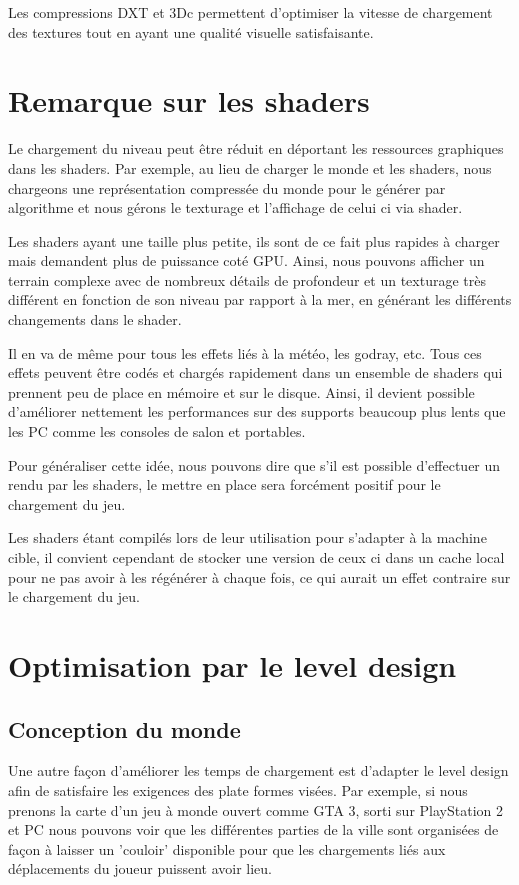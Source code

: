 \documentclass[a4paper, 12pt]{article} %
\begin{document}
Les compressions DXT et 3Dc permettent d'optimiser la vitesse de chargement des textures tout en ayant une qualité visuelle satisfaisante.

\newpage
\section{Remarque sur les shaders}
Le chargement du niveau peut être réduit en déportant les ressources graphiques dans les shaders. Par exemple, au lieu de charger le monde et les shaders, nous chargeons une représentation compressée du monde pour le générer par algorithme et nous gérons le texturage et l'affichage de celui ci via shader. 

Les shaders ayant une taille plus petite, ils sont de ce fait plus rapides à charger mais demandent plus de puissance coté GPU. Ainsi, nous pouvons afficher un terrain complexe avec de nombreux détails de profondeur et un texturage très différent en fonction de son niveau par rapport à la mer, en générant les différents changements dans le shader.

Il en va de même pour tous les effets liés à la météo, les godray, etc. Tous ces effets peuvent être codés et chargés rapidement dans un ensemble de shaders qui prennent peu de place en mémoire et sur le disque. Ainsi, il devient possible d'améliorer nettement les performances sur des supports beaucoup plus lents que les PC comme les consoles de salon et portables.

Pour généraliser cette idée, nous pouvons dire que s'il est possible d'effectuer un rendu par les shaders, le mettre en place sera forcément positif pour le chargement du jeu.

Les shaders étant compilés lors de leur utilisation pour s'adapter à la machine cible, il convient cependant de stocker une version de ceux ci dans un cache local pour ne pas avoir à les régénérer à chaque fois, ce qui aurait un effet contraire sur le chargement du jeu.

\newpage
\section{Optimisation par le level design}
\subsection{Conception du monde}
Une autre façon d'améliorer les temps de chargement est d'adapter le level design afin de satisfaire les exigences des plate formes visées. Par exemple, si nous prenons la carte d'un jeu à monde ouvert comme GTA 3, sorti sur PlayStation 2 et PC nous pouvons voir que les différentes parties de la ville sont organisées de façon à laisser un 'couloir' disponible pour que les chargements liés aux déplacements du joueur puissent avoir lieu.
\end{document}
